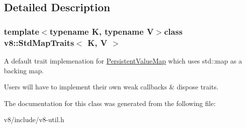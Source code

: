 \subsection{Detailed Description}
\subsubsection*{template$<$typename K, typename V$>$class v8\+::\+Std\+Map\+Traits$<$ K, V $>$}

A default trait implemenation for \hyperlink{classv8_1_1PersistentValueMap}{Persistent\+Value\+Map} which uses std\+::map as a backing map.

Users will have to implement their own weak callbacks \& dispose traits. 

The documentation for this class was generated from the following file\+:\begin{DoxyCompactItemize}
\item 
v8/include/v8-\/util.\+h\end{DoxyCompactItemize}
